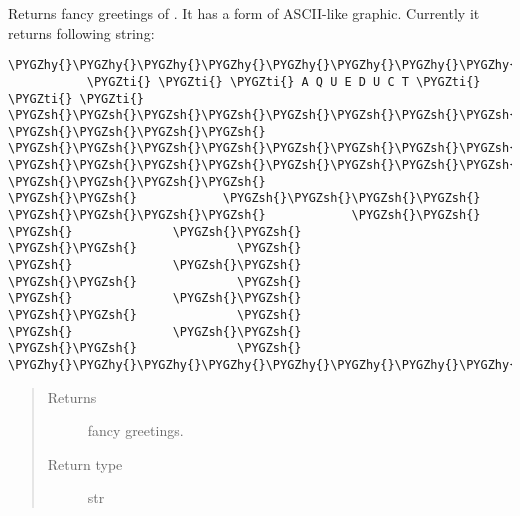\documentclass[a4paper,10pt,english]{sphinxmanual}
\def\PYGZsh{\char`\#}
\def\PYGZhy{\char`\-}
\def\PYGZti{\char`\~}
\begin{document}
\begin{fulllineitems}
\label{aqueduct:aqueduct.greetings}
Returns fancy greetings of {\hyperref[aqueduct:module-aqueduct]{}}. It has a form of ASCII-like
graphic. Currently it returns following string:

\begin{Verbatim}[commandchars=\\\{\}]
\PYGZhy{}\PYGZhy{}\PYGZhy{}\PYGZhy{}\PYGZhy{}\PYGZhy{}\PYGZhy{}\PYGZhy{}\PYGZhy{}\PYGZhy{}\PYGZhy{}\PYGZhy{}\PYGZhy{}\PYGZhy{}\PYGZhy{}\PYGZhy{}\PYGZhy{}\PYGZhy{}\PYGZhy{}\PYGZhy{}\PYGZhy{}\PYGZhy{}\PYGZhy{}\PYGZhy{}\PYGZhy{}\PYGZhy{}\PYGZhy{}\PYGZhy{}\PYGZhy{}\PYGZhy{}\PYGZhy{}\PYGZhy{}\PYGZhy{}\PYGZhy{}\PYGZhy{}\PYGZhy{}\PYGZhy{}\PYGZhy{}\PYGZhy{}\PYGZhy{}\PYGZhy{}\PYGZhy{}\PYGZhy{}\PYGZhy{}\PYGZhy{}\PYGZhy{}\PYGZhy{}\PYGZhy{}
           \PYGZti{} \PYGZti{} \PYGZti{} A Q U E D U C T \PYGZti{} \PYGZti{} \PYGZti{}
\PYGZsh{}\PYGZsh{}\PYGZsh{}\PYGZsh{}\PYGZsh{}\PYGZsh{}\PYGZsh{}\PYGZsh{}\PYGZsh{}\PYGZsh{}\PYGZsh{}\PYGZsh{}\PYGZsh{}\PYGZsh{}\PYGZsh{}\PYGZsh{}\PYGZsh{}\PYGZsh{}\PYGZsh{}\PYGZsh{}\PYGZsh{}\PYGZsh{}\PYGZsh{}\PYGZsh{}\PYGZsh{}\PYGZsh{}\PYGZsh{}\PYGZsh{}\PYGZsh{}\PYGZsh{}\PYGZsh{}\PYGZsh{}\PYGZsh{}\PYGZsh{}\PYGZsh{}\PYGZsh{}\PYGZsh{}\PYGZsh{}\PYGZsh{}\PYGZsh{}\PYGZsh{}\PYGZsh{}\PYGZsh{}\PYGZsh{}\PYGZsh{}\PYGZsh{}\PYGZsh{}\PYGZsh{}
\PYGZsh{}\PYGZsh{}\PYGZsh{}\PYGZsh{}        \PYGZsh{}\PYGZsh{}\PYGZsh{}\PYGZsh{}\PYGZsh{}\PYGZsh{}\PYGZsh{}\PYGZsh{}        \PYGZsh{}\PYGZsh{}\PYGZsh{}\PYGZsh{}\PYGZsh{}\PYGZsh{}\PYGZsh{}\PYGZsh{}        \PYGZsh{}\PYGZsh{}\PYGZsh{}\PYGZsh{}
\PYGZsh{}\PYGZsh{}            \PYGZsh{}\PYGZsh{}\PYGZsh{}\PYGZsh{}            \PYGZsh{}\PYGZsh{}\PYGZsh{}\PYGZsh{}            \PYGZsh{}\PYGZsh{}
\PYGZsh{}              \PYGZsh{}\PYGZsh{}              \PYGZsh{}\PYGZsh{}              \PYGZsh{}
\PYGZsh{}              \PYGZsh{}\PYGZsh{}              \PYGZsh{}\PYGZsh{}              \PYGZsh{}
\PYGZsh{}              \PYGZsh{}\PYGZsh{}              \PYGZsh{}\PYGZsh{}              \PYGZsh{}
\PYGZsh{}              \PYGZsh{}\PYGZsh{}              \PYGZsh{}\PYGZsh{}              \PYGZsh{}
\PYGZhy{}\PYGZhy{}\PYGZhy{}\PYGZhy{}\PYGZhy{}\PYGZhy{}\PYGZhy{}\PYGZhy{}\PYGZhy{}\PYGZhy{}\PYGZhy{}\PYGZhy{}\PYGZhy{}\PYGZhy{}\PYGZhy{}\PYGZhy{}\PYGZhy{}\PYGZhy{}\PYGZhy{}\PYGZhy{}\PYGZhy{}\PYGZhy{}\PYGZhy{}\PYGZhy{}\PYGZhy{}\PYGZhy{}\PYGZhy{}\PYGZhy{}\PYGZhy{}\PYGZhy{}\PYGZhy{}\PYGZhy{}\PYGZhy{}\PYGZhy{}\PYGZhy{}\PYGZhy{}\PYGZhy{}\PYGZhy{}\PYGZhy{}\PYGZhy{}\PYGZhy{}\PYGZhy{}\PYGZhy{}\PYGZhy{}\PYGZhy{}\PYGZhy{}\PYGZhy{}\PYGZhy{}
\end{Verbatim}
\begin{quote}\begin{description}
\item[{Returns}] \leavevmode
{\hyperref[aqueduct:module-aqueduct]{}} fancy greetings.

\item[{Return type}] \leavevmode
str

\end{description}\end{quote}

\end{fulllineitems}
\end{document}
